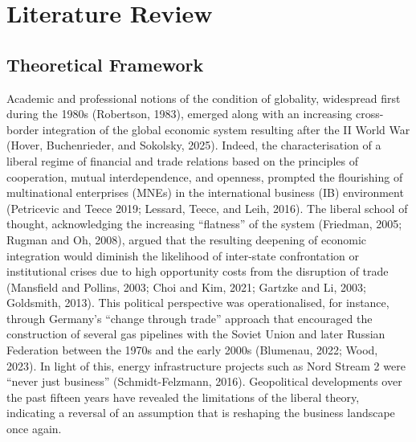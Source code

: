 \documentclass[authoryear,preprint,review,12pt]{elsarticle}
\begin{document}
\section{Literature Review}
\label{sec:lit}

\subsection{Theoretical Framework}

Academic and professional notions of the condition of globality, widespread first during the 1980s (Robertson, 1983), emerged along with an increasing cross-border integration of the global economic system resulting after the II World War (Hover, Buchenrieder, and Sokolsky, 2025). Indeed, the characterisation of a liberal regime of financial and trade relations based on the principles of cooperation, mutual interdependence, and openness, prompted the flourishing of multinational enterprises (MNEs) in the international business (IB) environment (Petricevic and Teece 2019; Lessard, Teece, and Leih, 2016). The liberal school of thought, acknowledging the increasing ``flatness'' of the system (Friedman, 2005; Rugman and Oh, 2008), argued that the resulting deepening of economic integration would diminish the likelihood of inter-state confrontation or institutional crises due to high opportunity costs from the disruption of trade (Mansfield and Pollins, 2003; Choi and Kim, 2021; Gartzke and Li, 2003; Goldsmith, 2013). This political perspective was operationalised, for instance, through Germany's ``change through trade'' approach that encouraged the construction of several gas pipelines with the Soviet Union and later Russian Federation between the 1970s and the early 2000s (Blumenau, 2022; Wood, 2023). In light of this, energy infrastructure projects such as Nord Stream 2 were ``never just business'' (Schmidt-Felzmann, 2016). Geopolitical developments over the past fifteen years have revealed the limitations of the liberal theory, indicating a reversal of an assumption that is reshaping the business landscape once again.
\end{document}
